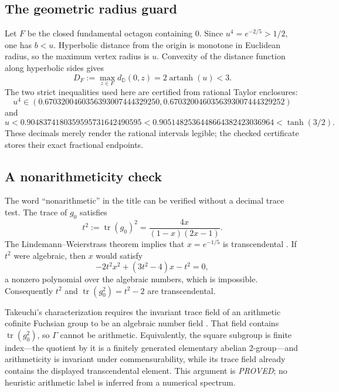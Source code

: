 \documentclass[11pt,a4paper]{article}
\theoremstyle{definition}
\newcommand{\D}{\mathbb D}
\newcommand{\tr}{\operatorname{tr}}
\begin{document}
\subsection{The geometric radius guard}

Let \(F\) be the closed fundamental octagon containing \(0\).  Since
\(u^4=e^{-2/5}>1/2\), one has \(b<u\).  Hyperbolic distance from the origin is
monotone in Euclidean radius, so the maximum vertex radius is \(u\).  Convexity
of the distance function along hyperbolic sides gives
\begin{equation}\label{eq:DF}
 D_F:=\max_{z\in F}d_{\D}(0,z)=2\operatorname{artanh}(u)<3.
\end{equation}
The two strict inequalities used here are certified from rational Taylor
enclosures:
\[
 u^4\in(0.6703200460356393007444329250,
        0.6703200460356393007444329252)
\]
and
\[
 u<0.9048374180359595731642490595
   <0.9051482536448664382423036964<\tanh(3/2).
\]
These decimals merely render the rational intervals legible; the checked
certificate stores their exact fractional endpoints.

\subsection{A nonarithmeticity check}

The word ``nonarithmetic'' in the title can be verified without a decimal
trace test.  The trace of \(g_0\) satisfies
\begin{equation}\label{eq:t2}
 t^2:=\tr(g_0)^2
 =\frac{4x}{(1-x)(2x-1)}.
\end{equation}
The Lindemann--Weierstrass theorem implies that \(x=e^{-1/5}\) is
transcendental \cite[Cor.~3.2]{Popescu2024}.  If \(t^2\) were algebraic, then
\(x\) would satisfy
\begin{equation}\label{eq:quadratic-x}
 -2t^2x^2+(3t^2-4)x-t^2=0,
\end{equation}
a nonzero polynomial over the algebraic numbers, which is impossible.
Consequently \(t^2\) and \(\tr(g_0^2)=t^2-2\) are transcendental.

Takeuchi's characterization requires the invariant trace field of an
arithmetic cofinite Fuchsian group to be an algebraic number field
\cite[Thm.~1 and condition~(i)]{Takeuchi1975}.  That field contains
\(\tr(g_0^2)\), so \(\Gamma\) cannot be arithmetic.  Equivalently, the square
subgroup is finite index---the quotient by it is a finitely generated
elementary abelian \(2\)-group---and arithmeticity is invariant under
commensurability, while its trace field already contains the displayed
transcendental element.  This argument is \emph{PROVED}; no heuristic
arithmetic label is inferred from a numerical spectrum.
\end{document}
